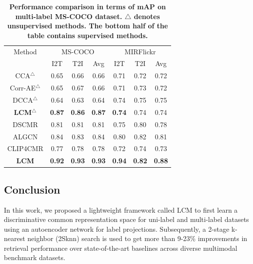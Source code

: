 \begin{table}
\centering
  \caption{\textbf{Performance comparison in terms of mAP on multi-label MS-COCO dataset. $\triangle$ denotes unsupervised methods. The bottom half of the table contains supervised methods.}}
  \label{tab:sota_coco}
  \setlength{\tabcolsep}{12pt}
  \begin{tabular}{c|ccc|ccc}
    \toprule
     Method & \multicolumn{3}{c}{MS-COCO} &\multicolumn{3}{c}{MIRFlickr}\\
     & I2T & T2I & Avg & I2T & T2I & Avg\\
     \midrule
    CCA$^\triangle$  \cite{cca}&  0.65 &  0.66 &  0.66 & 0.71 & 0.72 & 0.72 \\
    Corr-AE$^\triangle$  \cite{corr-ae}&  0.65 &  0.67 &  0.66 & 0.71 & 0.73 & 0.72\\
    DCCA$^\triangle$  \cite{dcca} &  0.64 &  0.63 &  0.64 & 0.74 & 0.75 & 0.75\\
    \textbf{LCM$^\triangle$} & \textbf{0.87} & \textbf{0.86} & \textbf{0.87} & \textbf{0.74} & 0.74 & 0.74\\
    \bottomrule
    DSCMR \cite{dscmr} &  0.81 &  0.81 &  0.81 & 0.75 & 0.80 & 0.78\\
    ALGCN \cite{algcn} &  0.84 &  0.83 &  0.84 & 0.80 & 0.82 & 0.81\\
    CLIP4CMR \cite{clip4cmr} & 0.77 & 0.78 & 0.78 & 0.72 & 0.74 & 0.73\\
    \textbf{LCM} & \textbf{0.92} & \textbf{0.93} & \textbf{0.93} & \textbf{0.94} & \textbf{0.82} & \textbf{0.88}\\
  \bottomrule
\end{tabular}
\end{table}

\subsection{Conclusion}
In this work, we proposed a lightweight framework called LCM to first learn a discriminative common representation space for uni-label and multi-label datasets using an autoencoder network for label projections. Subsequently, a 2-stage k-nearest neighbor (2Sknn) search is used to get more than 9-23\% improvements in retrieval performance over state-of-the-art baselines across diverse multimodal benchmark datasets.

